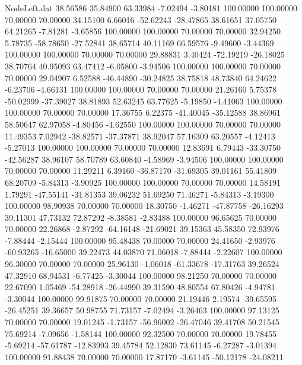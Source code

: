 \begin{filecontents}{NodeLeft.dat}
  38.56586   35.84900   63.33984    -7.02494   -3.80181  100.00000  100.00000   70.00000   70.00000   34.15100    6.66016  -52.62243  -28.47865
  38.61651   37.05750   64.21265    -7.81281   -3.65856  100.00000  100.00000   70.00000   70.00000   32.94250    5.78735  -58.78650  -27.52841
  38.65714   40.11169   66.59576    -9.49600   -3.44369  100.00000  100.00000   70.00000   70.00000   29.88831    3.40424  -72.19219  -26.18025
  38.70764   40.95093   63.47412    -6.05800   -3.94506  100.00000  100.00000   70.00000   70.00000   29.04907    6.52588  -46.44890  -30.24825
  38.75818   48.73840   64.24622    -6.23706   -4.66131  100.00000  100.00000   70.00000   70.00000   21.26160    5.75378  -50.02999  -37.39027
  38.81893   52.63245   63.77625    -5.19850   -4.41063  100.00000  100.00000   70.00000   70.00000   17.36755    6.22375  -41.40045  -35.12588
  38.86961   58.50647   62.97058    -4.80456   -4.62550  100.00000  100.00000   70.00000   70.00000   11.49353    7.02942  -38.82571  -37.37871
  38.92047   57.16309   63.20557    -4.12413   -5.27013  100.00000  100.00000   70.00000   70.00000   12.83691    6.79443  -33.30750  -42.56287
  38.96107   58.70789   63.60840    -4.58969   -3.94506  100.00000  100.00000   70.00000   70.00000   11.29211    6.39160  -36.87170  -31.69305
  39.01161   55.41809   68.20709    -5.84313   -3.90925  100.00000  100.00000   70.00000   70.00000   14.58191    1.79291  -47.55141  -31.81353
  39.06232   51.69250   71.46271    -5.84313   -3.19300  100.00000   98.90938   70.00000   70.00000   18.30750   -1.46271  -47.87758  -26.16293
  39.11301   47.73132   72.87292    -8.38581   -2.83488  100.00000   96.65625   70.00000   70.00000   22.26868   -2.87292  -64.16148  -21.69021
  39.15363   45.58350   72.93976    -7.88444   -2.15444  100.00000   95.48438   70.00000   70.00000   24.41650   -2.93976  -60.93265  -16.65000
  39.22473   44.03870   71.06018    -7.88444   -2.22607  100.00000   96.30000   70.00000   70.00000   25.96130   -1.06018  -61.33678  -17.31763
  39.26524   47.32910   68.94531    -6.77425   -3.30044  100.00000   98.21250   70.00000   70.00000   22.67090    1.05469  -54.28918  -26.44990
  39.31590   48.80554   67.80426    -4.94781   -3.30044  100.00000   99.91875   70.00000   70.00000   21.19446    2.19574  -39.65595  -26.45251
  39.36657   50.98755   71.73157    -7.02494   -3.26463  100.00000   97.13125   70.00000   70.00000   19.01245   -1.73157  -56.96002  -26.47046
  39.41708   50.21545   75.69214    -7.09656   -1.58144  100.00000   92.32500   70.00000   70.00000   19.78455   -5.69214  -57.61787  -12.83993
  39.45784   52.12830   73.61145    -6.27287   -3.01394  100.00000   91.88438   70.00000   70.00000   17.87170   -3.61145  -50.12178  -24.08211

\end{filecontents}
